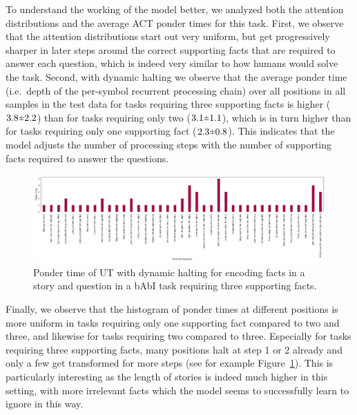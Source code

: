 



To understand the working of the model better, we analyzed both the attention distributions and the average ACT ponder times for this task. First, we observe that the attention distributions start out very uniform, but get progressively sharper in later steps around the correct supporting facts that are required to answer each question, which is indeed very similar to how humans would solve the task. 
%
Second, with dynamic halting we observe that the average ponder time (i.e.\ depth of the per-symbol recurrent processing chain) over all positions in all samples in the test data for tasks requiring three supporting facts is higher ($3.8 \rpm 2.2$) than for tasks requiring only two ($3.1 \rpm 1.1$), which is in turn higher than for tasks requiring only one supporting fact ($2.3 \rpm 0.8$). This indicates that the model adjusts the number of processing steps with the number of supporting facts required to answer the questions. 

\begin{figure}[t]
 \centering
 \includegraphics[width=\textwidth]{04-part-03/chapter-06/figs_and_tables/fig_task3_example_ponder.png}
 \caption{Ponder time of UT with dynamic halting for encoding facts in a story and question in a bAbI task requiring three supporting facts.}
 \label{fig:act_ponder}
\end{figure}
Finally, we observe that the histogram of ponder times at different positions is more uniform in tasks requiring only one supporting fact compared to two and three, and likewise for tasks requiring two compared to three.  Especially for tasks requiring three supporting facts, many positions halt at step 1 or 2 already and only a few get transformed for more steps (see for example Figure~\ref{fig:act_ponder}). This is particularly interesting as the length of stories is indeed much higher in this setting, with more irrelevant facts which the model seems to successfully learn to ignore in this way.


